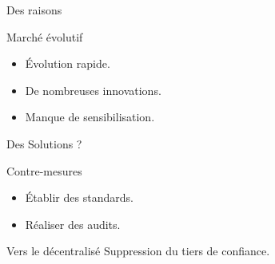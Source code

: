 \begin{frame}{Des raisons }%
    \begin{block}{Marché évolutif}
        \begin{itemize}
            \item Évolution rapide.
            \item De nombreuses innovations.
            \item Manque de sensibilisation.
        \end{itemize}
    \end{block}

\end{frame}

\begin{frame}{Des Solutions ?}
    \begin{block}{Contre-mesures}
        \begin{itemize}
            \item Établir des standards. 
            \item Réaliser des audits.
        \end{itemize}
    \end{block}
    \pause
    \begin{block}{Vers le décentralisé}
        Suppression du tiers de confiance.
    \end{block}
\end{frame}

